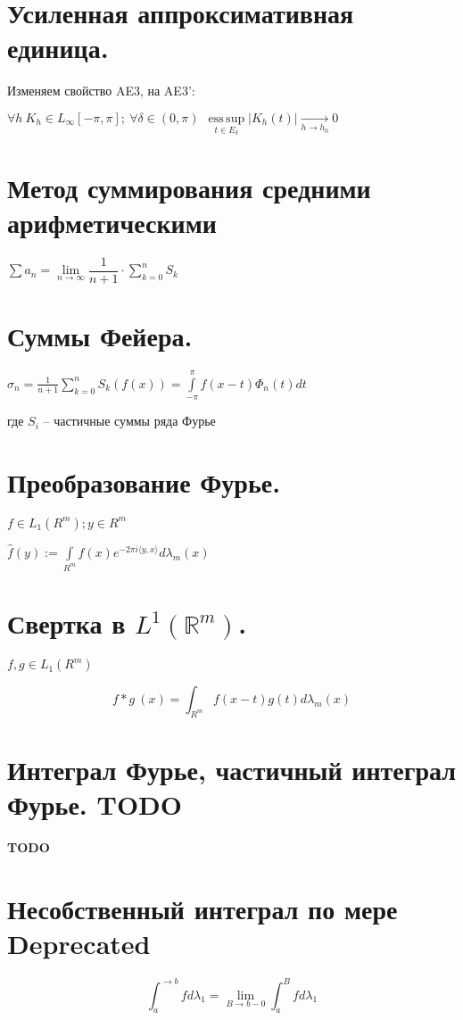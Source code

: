 \documentclass[paper=a4, fontsize=17pt]{article}
\DeclareMathOperator*{\esssup}{ess\, sup}
\begin{document}
\section{Усиленная аппроксимативная единица.}
	
	Изменяем свойство AE3, на AE3': 
	
	$ \forall h ~ K_h \in L_\infty[-\pi, \pi]; ~ \forall \delta \in (0, \pi) ~ ~ \esssup\limits_{t \in E_\delta} |K_h(t)| \underset{h \rightarrow h_0}{\rightarrow} 0 $
	
\section{Метод суммирования средними арифметическими}
	$\sum a_n = \lim\limits_{n \to \infty} \dfrac{1}{n+1} \cdot \sum\limits_{k=0}^n S_k$
\section{Суммы Фейера.}
	$ \sigma_n = \frac{1}{n + 1} \sum\limits_{k=0}^{n} S_k(f(x)) = \int\limits_{-\pi}^{\pi} f(x - t) \Phi_n(t) dt$
	
	где $ S_i $ -- частичные суммы ряда Фурье
\section{Преобразование Фурье.}
	$ f \in L_1(R^m); y \in R^m$
	
	$  \hat{f}(y) := \int\limits_{R^m} f(x)e^{-2\pi i \langle y, x \rangle} d\lambda_m(x) $
\section{Свертка в $L^1(\mathds{R}^m)$.}
	
	$ f, g \in L_1(R^m) $
	
	$$ f \ast g ~ (x) = \int_{R^m} f(x - t) g(t) d\lambda_m(x)$$
	
\section{Интеграл Фурье, частичный интеграл Фурье. TODO}
	{\color{red} \textbf{TODO}}


	\section{Несобственный интеграл по мере \Large Deprecated}

	$$ \int_{a}^{\rightarrow b} f d\lambda_1 = \lim\limits_{B \rightarrow b-0} \int_{a}^{B} f d\lambda_1 $$
\end{document}

